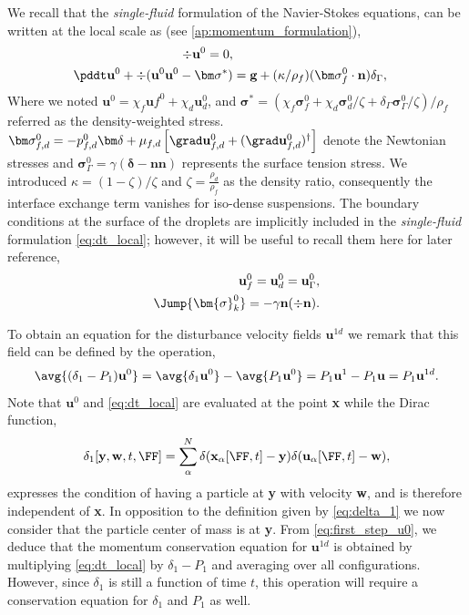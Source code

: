 We recall that the \textit{single-fluid} formulation of the Navier-Stokes equations, can be written at the local scale as (see \ref{ap:momentum_formulation}),
\begin{align}
    \label{eq:dt_local_mass}
    \div \textbf{u}^0 = 0, \\
    \pddt \textbf{u}^0
    + \div (\textbf{u}^0\textbf{u}^0 - \bm\sigma^*)
    &= \textbf{g}
    +(\kappa/\rho_f)(\bm\sigma_f^0\cdot \textbf{n})\delta_\Gamma,
    \label{eq:dt_local}
\end{align}
Where we noted $\textbf{u}^0 = \chi_f \textbf{u}f^0 + \chi_d \textbf{u}_d^0$, and $\bm\sigma^* = (\chi_f \bm\sigma_f^0 + \chi_d \bm\sigma_d^0/\zeta + \delta_\Gamma \bm\sigma_\Gamma^0/\zeta )/\rho_f $ referred as the density-weighted stress.
$\bm\sigma_{f,d}^0 = -p_{f,d}^0\bm\delta + \mu_{f,d}\left[\grad \textbf{u}_{f,d}^0+ (\grad \textbf{u}_{f,d}^0)^\dagger\right]$ denote the Newtonian stresses and $\bm\sigma_\Gamma^0 = \gamma (\bm\delta - \textbf{nn})$ represents the surface tension stress. 
We introduced $\kappa = (1-\zeta)/\zeta$ and $\zeta = \frac{\rho_d}{\rho_f}$ as the density ratio, consequently the interface exchange term vanishes for iso-dense suspensions. 
The boundary conditions at the surface of the droplets are implicitly included in the \textit{single-fluid} formulation \eqref{eq:dt_local}; however, it will be useful to recall them here for later reference, 
\begin{align}
    \label{eq:dt_rho_I3}
    \textbf{u}_f^0 = \textbf{u}_d^0 = \textbf{u}_\Gamma^0, \\
    \Jump{\bm{\sigma}_k^0} 
    =
    -\gamma\textbf{n}(\div \textbf{n}). 
    \label{eq:dt_rho_I2}
\end{align}

To obtain an equation for the disturbance velocity fields $\textbf{u}^{1d}$ we remark that this field can be defined by the operation, 
\begin{equation}
    \avg{(\delta_1 - P_1) \textbf{u}^0}
    =
    \avg{\delta_1 \textbf{u}^0}
    - \avg{P_1 \textbf{u}^0}
    = 
    P_1 \textbf{u}^1
    - P_1 \textbf{u}
    = P_1 \textbf{u}^{1d}. 
    \label{eq:first_step_u0}
\end{equation}
Note that $\textbf{u}^0$ and \ref{eq:dt_local} are evaluated at the point \textbf{x} while the Dirac function, 
\begin{equation}
    \delta_1[\textbf{y},\textbf{w},t,\FF] = \sum_\alpha^N \delta(\textbf{x}_\alpha[\FF,t]-\textbf{y})\delta(\textbf{u}_\alpha[\FF,t] - \textbf{w}),
\end{equation}
expresses the condition of having a particle at \textbf{y} with velocity \textbf{w}, and is therefore independent of \textbf{x}. 
In opposition to the definition given by \ref{eq:delta_1} we now consider that the particle center of mass is at \textbf{y}. 
From \ref{eq:first_step_u0}, we deduce that the momentum conservation equation for $\textbf{u}^{1d}$ is obtained by multiplying \ref{eq:dt_local} by $\delta_1 - P_1$ and averaging over all configurations. 
However, since $\delta_1$ is still a function of time $t$, this operation will require a conservation equation for $\delta_1$ and $P_1$ as well.  

